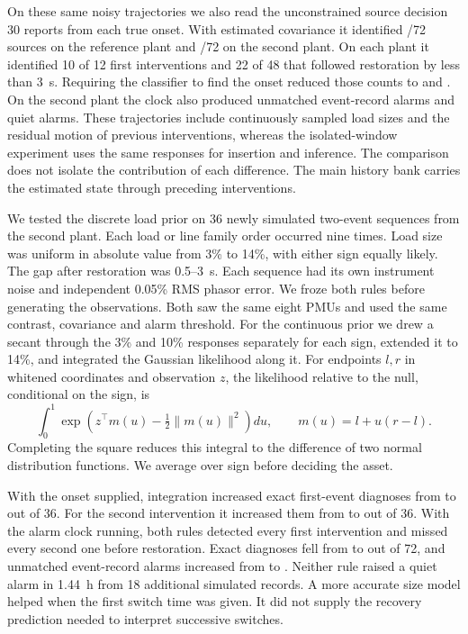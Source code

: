 On these same noisy trajectories we also read the unconstrained source
decision 30 reports from each true onset. With estimated covariance it
identified \ContrastFAtOnset{}/72 sources on the reference plant and
\ContrastPAtOnset{}/72 on the second plant. On each plant it identified
10 of 12 first interventions and 22 of 48 that followed restoration
by less than 3~s. Requiring the classifier
to find the onset reduced those counts to \ContrastFExact{} and
\ContrastPExact{}. On the second plant the clock also produced
\ContrastPExtra{} unmatched event-record alarms and \ContrastPQuiet{}
quiet alarms. These trajectories include continuously sampled load
sizes and the residual motion of previous interventions, whereas the
isolated-window experiment uses the same responses for insertion and
inference. The comparison does not isolate the contribution of each
difference. The main history bank carries the estimated state through
preceding interventions.

We tested the discrete load prior on 36 newly simulated two-event
sequences from the second plant. Each load or line family order
occurred nine times. Load size was uniform in absolute value from
3\% to 14\%, with either sign equally likely. The gap after restoration
was 0.5--3~s. Each sequence had its own instrument noise and independent
0.05\% RMS phasor error. We froze both rules before generating the
observations. Both saw the same eight PMUs and used the same contrast,
covariance and alarm threshold. For the continuous prior we drew a
secant through the 3\% and 10\% responses separately for each sign,
extended it to 14\%, and integrated the Gaussian likelihood along it.
For endpoints $l,r$ in whitened coordinates and observation $z$,
the likelihood relative to the null, conditional on the sign, is
\[
 \int_0^1 \exp\!\left(z^\top m(u)-\tfrac12\|m(u)\|^2\right)du,
 \qquad m(u)=l+u(r-l).
\]
Completing the square reduces this integral to the difference of two
normal distribution functions. We average over sign before deciding
the asset.

With the onset supplied, integration increased exact first-event
diagnoses from \SizeGridFirst{} to \SizeIntegralFirst{} out of 36.
For the second intervention it increased them from \SizeGridSecond{}
to \SizeIntegralSecond{} out of 36. With the alarm clock running,
both rules detected every first intervention and missed every
second one before restoration. Exact diagnoses fell from
\SizeGridExact{} to \SizeIntegralExact{} out of 72, and unmatched
event-record alarms increased from \SizeGridExtra{} to
\SizeIntegralExtra{}. Neither rule raised a quiet alarm in 1.44~h
from 18 additional simulated records. A more accurate size model
helped when the first switch time was given. It did not supply the
recovery prediction needed to interpret successive switches.
